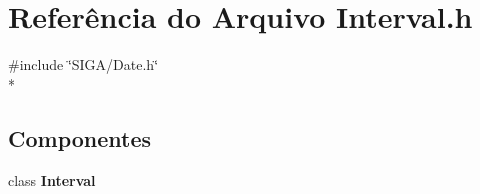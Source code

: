 \section{Referência do Arquivo Interval.\+h}
\label{_interval_8h}
{\ttfamily \#include \char`\"{}S\+I\+G\+A/\+Date.\+h\char`\"{}}\\*
\subsection*{Componentes}
\begin{DoxyCompactItemize}
\item 
class {\bf Interval}
\end{DoxyCompactItemize}
